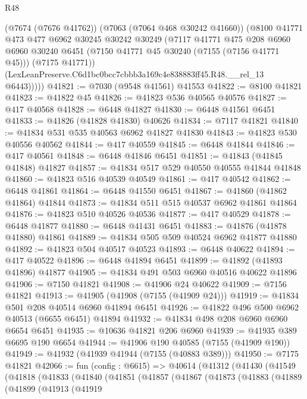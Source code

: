 \begin{lexlean}{R48}
\begin{coremodule}
          (@7674 (@7676 @41762))
          (@7063 (@7064 @468 @30242 @41660))
          (@8100
            @41771
            @473
            @477
            @6962
            @30245
            @30242
            @30249
            (@7117
              @41771
              @475
              @208
              @6960
              @6960
              @30240
              @6451
              (@7150 @41771 @45 @30240 (@7155 (@7156 @41771 @45)))
              (@7175 @41771))
            (LexLeanPreserve.C6d1bc0bcc7cbbb3a169c4e838883ff45.R48.__rel_13 @6443)))))
@41821 := @7030 (@9548 @41561) @41553
@41822 := @8100 @41821
@41823 := @41822 @45
@41826 := @41823 @536 @40565 @40576
@41827 := @417 @40568
@41828 := @6448 @41827
@41830 := @6448 @41561 @6451
@41833 := @41826 (@41828 @41830) @40626
@41834 := @7117 @41821
@41840 := @41834 @531 @535 @40563 @6962 @41827 @41830
@41843 := @41823 @530 @40556 @40562
@41844 := @417 @40559
@41845 := @6448 @41844
@41846 := @417 @40561
@41848 := @6448 @41846 @6451
@41851 := @41843 (@41845 @41848) @41827
@41857 := @41834 @517 @529 @40550 @40555 @41844 @41848
@41860 := @41823 @516 @40539 @40549
@41861 := @417 @40542
@41862 := @6448 @41861
@41864 := @6448 @41550 @6451
@41867 := @41860 (@41862 @41864) @41844
@41873 := @41834 @511 @515 @40537 @6962 @41861 @41864
@41876 := @41823 @510 @40526 @40536
@41877 := @417 @40529
@41878 := @6448 @41877
@41880 := @6448 @41431 @6451
@41883 := @41876 (@41878 @41880) @41861
@41889 := @41834 @505 @509 @40524 @6962 @41877 @41880
@41892 := @41823 @504 @40517 @40523
@41893 := @6448 @40622
@41894 := @417 @40522
@41896 := @6448 @41894 @6451
@41899 := @41892 (@41893 @41896) @41877
@41905 := @41834 @491 @503 @6960 @40516 @40622 @41896
@41906 := @7150 @41821
@41908 := @41906 @24 @40622
@41909 := @7156 @41821
@41913 := @41905 (@41908 (@7155 (@41909 @24)))
@41919 := @41834 @501 @208 @40514 @6960 @41894 @6451
@41926 := @41822 @496 @500 @6962 @40513 (@6655 @6451) @41894
@41932 := @41834 @498 @208 @6960 @6960 @6654 @6451
@41935 := @10636 @41821 @206 @6960
@41939 := @41935 @389 @6695 @190 @6654
@41944 := @41906 @190 @40585 (@7155 (@41909 @190))
@41949 := @41932 (@41939 @41944 (@7155 (@40883 @389)))
@41950 := @7175 @41821
@42066 := fun (config : @6615) =>
  @40614
    (@41312
      (@41430
        (@41549
          (@41818
            (@41833
              (@41840
                (@41851
                  (@41857
                    (@41867
                      (@41873
                        (@41883
                          (@41889
                            (@41899
                              (@41913
                                (@41919

\end{coremodule}
\end{lexlean}
